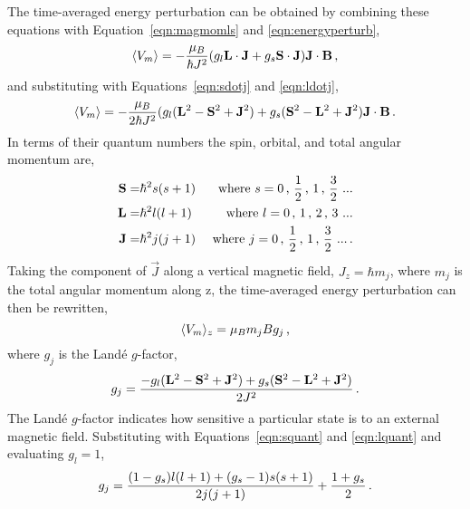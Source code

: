 The time-averaged energy perturbation can be obtained by combining these equations with Equation~\ref{eqn:magmomls} and \ref{eqn:energyperturb},
\begin{equation}\label{eqn:eperturbavg}
\langle V_m \rangle = -\frac{\mu_B}{\hbar J^2}(g_l \vec{L}\cdot \vec{J} + g_s \vec{S}\cdot\vec{J})\vec{J} \cdot \vec{B} \mbox{\,,}
\end{equation}
and substituting with Equations~\ref{eqn:sdotj} and \ref{eqn:ldotj},
\begin{equation}\label{eqn:eperturbavg2}
\langle V_m \rangle = -\frac{\mu_B}{2\hbar J^2 }(g_l (\vec{L}^2 -\vec{S}^2 + \vec{J}^2) + g_s (\vec{S}^2 - \vec{L}^2 + \vec{J}^2)\vec{J} \cdot \vec{B} \mbox{\,.}
\end{equation}
In terms of their quantum numbers the spin, orbital, and total angular momentum are, 
\begin{eqnarray}
\label{eqn:squant} \vec{S} =& \hbar^2s(s+1) & \mbox{ where } s=0\mbox{\,, }\frac{1}{2}\mbox{\,, }1\mbox{\,, }\frac{3}{2}\mbox{ ...} \\
\label{eqn:lquant} \vec{L} =& \hbar^2l(l+1) & \mbox{ where } l=0\mbox{\,, }1\mbox{\,, }2\mbox{\,, }3\mbox{ ...} \\
\label{eqn:jquant} \vec{J} =& \hbar^2j(j+1) & \mbox{ where } j=0\mbox{\,, }\frac{1}{2}\mbox{\,, }1\mbox{\,, }\frac{3}{2}\mbox{ ...\,.}
\end{eqnarray}
Taking the component of $\vec{J}$ along a vertical magnetic field, $J_z=\hbar m_j$, where $m_j$ is the total angular momentum along z, the time-averaged energy perturbation can then be rewritten,
\begin{equation}
\langle V_m \rangle_z = \mu_B m_j B g_j \mbox{\,,}
\end{equation}
where $g_j$ is the Land\'{e} $g$-factor,
\begin{equation}
g_j = \frac{-g_l(\vec{L}^2 -\vec{S}^2 + \vec{J}^2) + g_s (\vec{S}^2 - \vec{L}^2 + \vec{J}^2)}{2J^2} \mbox{\,.}
\end{equation}
The Land\'{e} $g$-factor indicates how sensitive a particular state is to an external magnetic field.
Substituting with Equations~\ref{eqn:squant} and \ref{eqn:lquant} and evaluating $g_l=1$,
\begin{equation}
g_j = \frac{(1-g_s)l(l+1)+(g_s-1)s(s+1)}{2j(j+1)} + \frac{1+g_s}{2} \mbox{\,.}
\end{equation}



